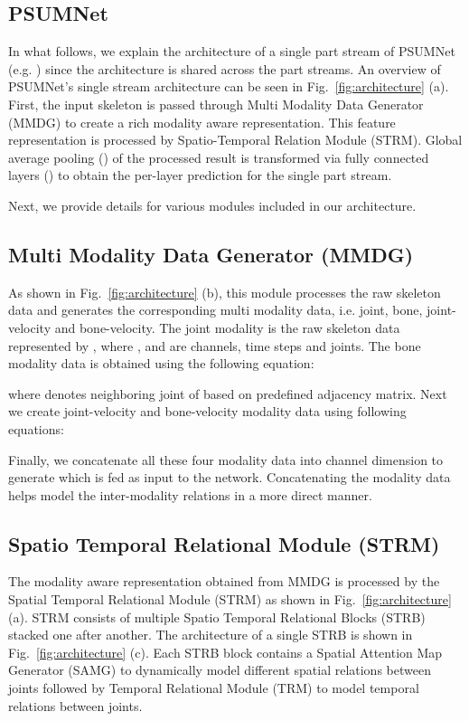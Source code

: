 \documentclass[runningheads]{llncs}
\begin{document}
\subsection{PSUMNet}
\label{sec:psumnet}

In what follows, we explain the architecture of a single part stream of PSUMNet  (e.g. ) since the architecture is shared across the part streams. An overview of PSUMNet's single stream architecture can be seen in Fig.~\ref{fig:architecture} (a). First, the input skeleton  is passed through Multi Modality Data Generator (MMDG) to create a rich modality aware  representation. This feature representation is processed by Spatio-Temporal Relation Module (STRM). Global average pooling () of the processed result is transformed via fully connected layers () to obtain the per-layer prediction for the single part stream.

Next, we provide details for various modules included in our architecture.

\subsection{Multi Modality Data Generator (MMDG)} 
\label{sec:mmdg}

As shown in Fig.~\ref{fig:architecture} (b), this module processes the raw skeleton data and generates the corresponding multi modality data, i.e. joint, bone, joint-velocity and bone-velocity. The joint modality is the raw skeleton data represented by , where ,  and  are channels, time steps and joints. The bone modality data is obtained using the following equation:


where  denotes neighboring joint of  based on predefined adjacency matrix. Next we create joint-velocity and bone-velocity modality data using following equations:





Finally, we concatenate all these four modality data into channel dimension to generate  which is fed as input to the network. Concatenating the modality data helps model the inter-modality relations in a more direct manner.

\subsection{Spatio Temporal Relational Module (STRM)}
\label{sec:strm}

The modality aware representation obtained from MMDG is processed by the Spatial Temporal Relational Module (STRM) as shown in Fig.~\ref{fig:architecture} (a). STRM consists of multiple Spatio Temporal Relational Blocks (STRB) stacked one after another. The architecture of a single STRB is shown in Fig.~\ref{fig:architecture} (c). Each STRB block contains a Spatial Attention Map Generator (SAMG) to dynamically model different spatial relations between joints followed by Temporal Relational Module (TRM) to model temporal relations between joints. 
\end{document}
